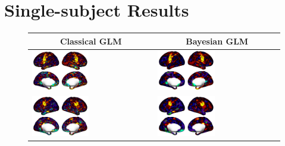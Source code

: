 \documentclass{article}
\begin{document}
	\section{Single-subject Results}
	\begin{figure}
		\begin{tabularx}{\textwidth}{|X|X|}
			\multicolumn{1}{c}{\textbf{Classical GLM}} & \multicolumn{1}{c}{\textbf{Bayesian GLM}}  \\ \hline
			\includegraphics[width=0.48\textwidth]{plots/600_subject_103818_tongue_classical_estimates.png} &
			\includegraphics[width=0.48\textwidth]{plots/600_subject_103818_tongue_estimates.png} \\ \hline
			\includegraphics[width=0.48\textwidth]{plots/600_subject_105923_tongue_classical_estimates.png} &
			\includegraphics[width=0.48\textwidth]{plots/600_subject_105923_tongue_estimates.png} \\ \hline

\end{tabularx}
\end{figure}
\end{document}

